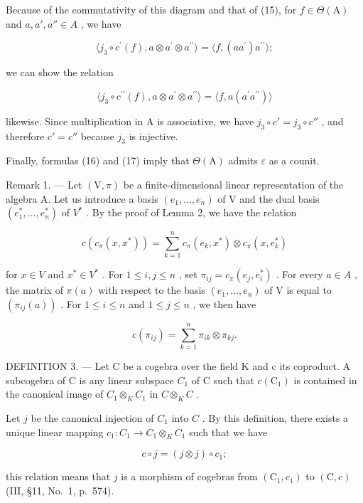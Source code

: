 Because of the commutativity of this diagram and that of (15), for \(f \in \Theta(\mathrm{A})\) and \(a, a', a'' \in A\) , we have

\[
\langle j _ {3} \circ c ^ {\prime} (f), a \otimes a ^ {\prime} \otimes a ^ {\prime \prime} \rangle = \langle f, (a a ^ {\prime}) a ^ {\prime \prime} \rangle ;
\]

we can show the relation

\[
\langle j _ {3} \circ c ^ {\prime \prime} (f), a \otimes a ^ {\prime} \otimes a ^ {\prime \prime} \rangle = \langle f, a (a ^ {\prime} a ^ {\prime \prime}) \rangle
\]

likewise. Since multiplication in A is associative, we have \(j_{3} \circ c' = j_{3} \circ c''\) , and therefore \(c' = c''\) because \(j_{3}\) is injective.

Finally, formulas (16) and (17) imply that \(\Theta(\mathrm{A})\) admits \(\varepsilon\) as a counit.

Remark 1. --- Let \((\mathrm{V},\pi)\) be a finite-dimensional linear representation of the algebra A. Let us introduce a basis \((e_{1},\ldots,e_{n})\) of V and the dual basis \((e_{1}^{*},\ldots,e_{n}^{*})\) of \(V^{*}\) . By the proof of Lemma 2, we have the relation

\[
c (c _ {\pi} (x, x ^ {*})) = \sum_ {k = 1} ^ {n} c _ {\pi} (e _ {k}, x ^ {*}) \otimes c _ {\pi} (x, e _ {k} ^ {*})\tag{19}
\]

for \(x \in V\) and \(x^{*} \in V^{*}\) . For \(1 \leqslant i, j \leqslant n\) , set \(\pi_{ij} = c_{\pi}(e_j, e_i^*)\) . For every \(a \in A\) , the matrix of \(\pi(a)\) with respect to the basis \((e_1, \ldots, e_n)\) of V is equal to \((\pi_{ij}(a))\) . For \(1 \leqslant i \leqslant n\) and \(1 \leqslant j \leqslant n\) , we then have

\[
c (\pi_ {i j}) = \sum_ {k = 1} ^ {n} \pi_ {i k} \otimes \pi_ {k j}.\tag{20}
\]

DEFINITION 3. --- Let C be a cogebra over the field K and c its coproduct. A subcogebra of C is any linear subspace \(C_{1}\) of C such that \(c(\mathrm{C}_{1})\) is contained in the canonical image of \(C_{1} \otimes_{K} C_{1}\) in \(C \otimes_{K} C\) .

Let \(j\) be the canonical injection of \(C_1\) into \(C\) . By this definition, there exists a unique linear mapping \(c_1: C_1 \to C_1 \otimes_K C_1\) such that we have

\[
c \circ j = (j \otimes j) \circ c _ {1};\tag{21}
\]

this relation means that \(j\) is a morphism of cogebras from \((\mathrm{C}_1, c_1)\) to \((\mathrm{C}, c)\) (III, §11, No.~1, p.~574).


